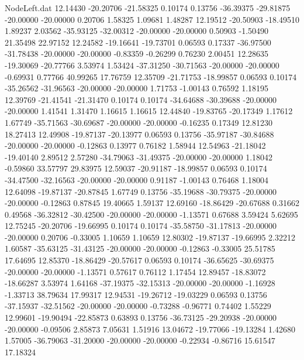 \begin{filecontents}{NodeLeft.dat}
  12.14430  -20.20706  -21.58325     0.10174    0.13756  -36.39375  -29.81875  -20.00000  -20.00000    0.20706    1.58325    1.09681    1.48287
  12.19512  -20.50903  -18.49510     1.89237    2.03562  -35.93125  -32.00312  -20.00000  -20.00000    0.50903   -1.50490   21.35498   22.97152
  12.24582  -19.16641  -19.73701     0.06593    0.17337  -36.97500  -31.78438  -20.00000  -20.00000   -0.83359   -0.26299    0.76230    2.00451
  12.28635  -19.30069  -20.77766     3.53974    1.53424  -37.31250  -30.71563  -20.00000  -20.00000   -0.69931    0.77766   40.99265   17.76759
  12.35709  -21.71753  -18.99857     0.06593    0.10174  -35.26562  -31.96563  -20.00000  -20.00000    1.71753   -1.00143    0.76592    1.18195
  12.39769  -21.41541  -21.31470     0.10174    0.10174  -34.64688  -30.39688  -20.00000  -20.00000    1.41541    1.31470    1.16615    1.16615
  12.44840  -19.83765  -20.17349     1.17612    1.67749  -35.71563  -30.69687  -20.00000  -20.00000   -0.16235    0.17349   12.81230   18.27413
  12.49908  -19.87137  -20.13977     0.06593    0.13756  -35.97187  -30.84688  -20.00000  -20.00000   -0.12863    0.13977    0.76182    1.58944
  12.54963  -21.18042  -19.40140     2.89512    2.57280  -34.79063  -31.49375  -20.00000  -20.00000    1.18042   -0.59860   33.57797   29.83975
  12.59037  -20.91187  -18.99857     0.06593    0.10174  -34.47500  -32.16563  -20.00000  -20.00000    0.91187   -1.00143    0.76468    1.18004
  12.64098  -19.87137  -20.87845     1.67749    0.13756  -35.19688  -30.79375  -20.00000  -20.00000   -0.12863    0.87845   19.40665    1.59137
  12.69160  -18.86429  -20.67688     0.31662    0.49568  -36.32812  -30.42500  -20.00000  -20.00000   -1.13571    0.67688    3.59424    5.62695
  12.75245  -20.20706  -19.66995     0.10174    0.10174  -35.58750  -31.17813  -20.00000  -20.00000    0.20706   -0.33005    1.10659    1.10659
  12.80302  -19.87137  -19.66995     2.32212    1.60587  -35.63125  -31.43125  -20.00000  -20.00000   -0.12863   -0.33005   25.51785   17.64695
  12.85370  -18.86429  -20.57617     0.06593    0.10174  -36.65625  -30.69375  -20.00000  -20.00000   -1.13571    0.57617    0.76112    1.17454
  12.89457  -18.83072  -18.66287     3.53974    1.64168  -37.19375  -32.15313  -20.00000  -20.00000   -1.16928   -1.33713   38.79634   17.99317
  12.94531  -19.26712  -19.03229     0.06593    0.13756  -37.15937  -32.51562  -20.00000  -20.00000   -0.73288   -0.96771    0.74402    1.55229
  12.99601  -19.90494  -22.85873     0.63893    0.13756  -36.73125  -29.20938  -20.00000  -20.00000   -0.09506    2.85873    7.05631    1.51916
  13.04672  -19.77066  -19.13284     1.42680    1.57005  -36.79063  -31.20000  -20.00000  -20.00000   -0.22934   -0.86716   15.61547   17.18324

\end{filecontents}
